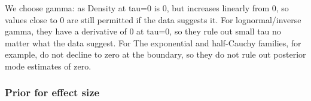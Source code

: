 \begin{outline}
\1 We choose gamma: as Density at tau=0 is 0, but increases linearly from 0, so values close to 0 are still permitted if the data suggests it.
    \2 For lognormal/inverse gamma, they have a derivative of 0 at tau=0, so they rule out small tau no matter what the data suggest.
    \2 For The exponential and half-Cauchy families, for example, do not decline to zero at the boundary, so they do not rule out posterior mode estimates of zero.

\end{outline}

\subsubsection{Prior for  effect size}


